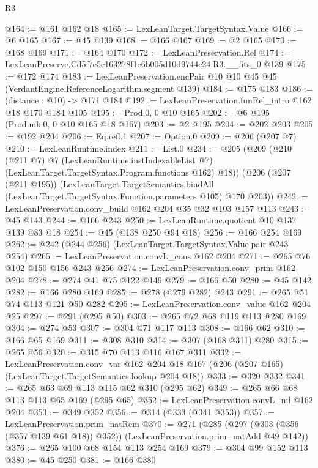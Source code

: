 \begin{lexlean}{R3}
\begin{coremodule}
@164 := @161 @162 @18
@165 := LexLeanTarget.TargetSyntax.Value
@166 := @6 @165
@167 := @45 @139
@168 := @166 @167
@169 := @2 @165
@170 := @168 @169
@171 := @164 @170
@172 := LexLeanPreservation.Rel
@174 := LexLeanPreserve.Cd5f7e5c163278f1e6b005d10d9744c24.R3.__fits_0 @139
@175 := @172 @174
@183 := LexLeanPreservation.encPair @10 @10 @45 @45 (VerdantEngine.ReferenceLogarithm.segment @139)
@184 := @175 @183
@186 := (distance : @10) -> @171 @184
@192 := LexLeanPreservation.funRel_intro @162 @18 @170 @184 @105
@195 := Prod.{0, 0} @10 @165
@202 := @6 @195 (Prod.mk.{0, 0} @10 @165 @18 @167)
@203 := @2 @195
@204 := @202 @203
@205 := @192 @204
@206 := Eq.refl.{1}
@207 := Option.{0}
@209 := @206 (@207 @7)
@210 := LexLeanRuntime.index
@211 := List.{0}
@234 := @205
    (@209
      (@210
        (@211 @7)
        @7
        (LexLeanRuntime.instIndexableList @7)
        (LexLeanTarget.TargetSyntax.Program.functions @162)
        @18))
    (@206
      (@207 (@211 @195))
      (LexLeanTarget.TargetSemantics.bindAll
        (LexLeanTarget.TargetSyntax.Function.parameters @105)
        @170
        @203))
@242 := LexLeanPreservation.conv_build @162 @204 @35 @32 @103 @157 @113
@243 := @45 @143
@244 := @166 @243
@250 := LexLeanRuntime.quotient @10 @137 @139 @83 @18
@254 := @45 (@138 @250 @94 @18)
@256 := @166 @254 @169
@262 := @242 (@244 @256) (LexLeanTarget.TargetSyntax.Value.pair @243 @254)
@265 := LexLeanPreservation.convL_cons @162 @204
@271 := @265 @76 @102 @150 @156 @243 @256
@274 := LexLeanPreservation.conv_prim @162 @204
@278 := @274 @41 @75 @122 @149
@279 := @166 @50
@280 := @45 @142
@282 := @166 @280 @169
@285 := @278 (@279 @282) @243
@291 := @265 @51 @74 @113 @121 @50 @282
@295 := LexLeanPreservation.conv_value @162 @204 @25
@297 := @291 (@295 @50)
@303 := @265 @72 @68 @119 @113 @280 @169
@304 := @274 @53
@307 := @304 @71 @117 @113
@308 := @166 @62
@310 := @166 @65 @169
@311 := @308 @310
@314 := @307 (@168 @311) @280
@315 := @265 @56
@320 := @315 @70 @113 @116 @167 @311
@332 := LexLeanPreservation.conv_var
    @162
    @204
    @18
    @167
    (@206 (@207 @165) (LexLeanTarget.TargetSemantics.lookup @204 @18))
@333 := @320 @332
@341 := @265 @63 @69 @113 @115 @62 @310 (@295 @62)
@349 := @265 @66 @68 @113 @113 @65 @169 (@295 @65)
@352 := LexLeanPreservation.convL_nil @162 @204
@353 := @349 @352
@356 := @314 (@333 (@341 @353))
@357 := LexLeanPreservation.prim_natRem
@370 := @271
    (@285 (@297 (@303 (@356 (@357 @139 @61 @18)) @352)) (LexLeanPreservation.prim_natAdd @49 @142))
@376 := @265 @100 @68 @154 @113 @254 @169
@379 := @304 @99 @152 @113
@380 := @45 @250
@381 := @166 @380

\end{coremodule}
\end{lexlean}
